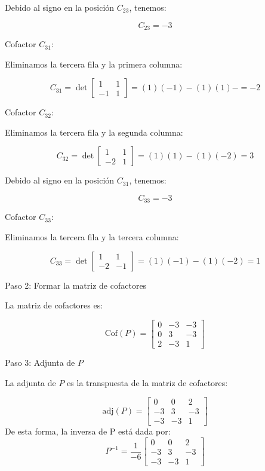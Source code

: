 \begin{enumerate}
Debido al signo en la posición \( C_{23} \), tenemos:

\[
C_{23} = -3
\]

 Cofactor \( C_{31} \):

Eliminamos la tercera fila y la primera columna:

\[
C_{31} = \det\begin{bmatrix}
1 & 1 \\
-1 & 1
\end{bmatrix} = (1)(-1) - (1)(1) - = -2
\]

 Cofactor \( C_{32} \):

Eliminamos la tercera fila y la segunda columna:

\[
C_{32} = \det\begin{bmatrix}
1 & 1 \\
-2 & 1
\end{bmatrix} = (1)(1) - (1)(-2) = 3
\]

Debido al signo en la posición \( C_{31} \), tenemos:

\[
C_{33} = -3
\]

 Cofactor \( C_{33} \):

Eliminamos la tercera fila y la tercera columna:

\[
C_{33} = \det\begin{bmatrix}
1 & 1 \\
-2 & -1
\end{bmatrix} = (1)(-1) - (1)(-2) = 1
\]

 Paso 2: Formar la matriz de cofactores

La matriz de cofactores es:

\[
\text{Cof}(P) = 
\begin{bmatrix}
0 & -3 & -3 \\
0 & 3 & -3 \\
2 & -3 & 1
\end{bmatrix}
\]

 Paso 3: Adjunta de \( P \)

La adjunta de \( P \) es la transpuesta de la matriz de cofactores:

\[
\text{adj}(P) = 
\begin{bmatrix}
0 & 0 & 2 \\
-3 & 3 & -3 \\
-3 & -3 & 1
\end{bmatrix}
\]
De esta forma, la inversa de P está dada por:
\[
P^{-1} = \frac{1}{-6} 
\begin{bmatrix}
0 & 0 & 2 \\
-3 & 3 & -3 \\
-3 & -3 & 1
\end{bmatrix}
\]


\end{enumerate}
